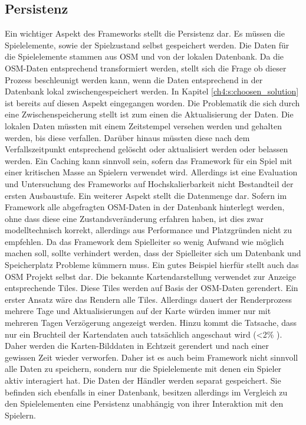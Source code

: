 \subsection*{Persistenz}

Ein wichtiger Aspekt des Frameworks stellt die Persistenz dar. Es müssen die Spielelemente, sowie der Spielzustand selbst gespeichert werden. Die Daten für die Spielelemente stammen aus OSM und von der lokalen Datenbank. Da die OSM-Daten entsprechend transformiert werden, stellt sich die Frage ob dieser Prozess beschleunigt werden kann, wenn die Daten entsprechend in der Datenbank lokal zwischengespeichert werden.
In Kapitel \ref{ch4:s:choosen_solution} ist bereits auf diesen Aspekt eingegangen worden. Die Problematik die sich durch eine Zwischenspeicherung stellt ist zum einen die Aktualisierung der Daten. Die lokalen Daten müssten mit einem Zeitstempel versehen werden und gehalten werden, bis diese \glqq verfallen\grqq. Darüber hinaus müssten diese nach dem Verfallszeitpunkt entsprechend gelöscht oder aktualisiert werden oder belassen werden. Ein Caching kann sinnvoll sein, sofern das Framework für ein Spiel mit einer kritischen Masse an Spielern verwendet wird. Allerdings ist eine Evaluation und Untersuchung des Frameworks auf Hochskalierbarkeit nicht Bestandteil der ersten Ausbaustufe. Ein weiterer Aspekt stellt die Datenmenge dar. Sofern im Framework alle abgefragten OSM-Daten in der Datenbank hinterlegt werden, ohne dass diese eine Zustandsveränderung erfahren haben, ist dies zwar modelltechnisch korrekt, allerdings aus Performance und Platzgründen nicht zu empfehlen.
Da das Framework dem Spielleiter so wenig Aufwand wie möglich machen soll, sollte verhindert werden, dass der Spielleiter sich um Datenbank und Speicherplatz Probleme kümmern muss. Ein gutes Beispiel hierfür stellt auch das OSM Projekt selbst dar. Die bekannte Kartendarstellung verwendet zur Anzeige entsprechende Tiles. Diese Tiles werden auf Basis der OSM-Daten gerendert. Ein erster Ansatz wäre das Rendern alle Tiles.
Allerdings dauert der Renderprozess mehrere Tage und Aktualisierungen auf der Karte würden immer nur mit mehreren Tagen Verzögerung angezeigt werden. Hinzu kommt die Tatsache, dass nur ein Bruchteil der Kartendaten auch tatsächlich angeschaut wird (<2\% \cite{Haklay.2008}). Daher werden die Karten-Bilddaten in Echtzeit gerendert und nach einer gewissen Zeit wieder verworfen.
Daher ist es auch beim Framework nicht sinnvoll alle Daten zu speichern, sondern nur die Spielelemente mit denen ein Spieler aktiv interagiert hat.
Die Daten der Händler werden separat gespeichert. Sie befinden sich ebenfalls in einer Datenbank, besitzen allerdings im Vergleich zu den Spielelementen eine Persistenz unabhängig von ihrer Interaktion mit den Spielern.


